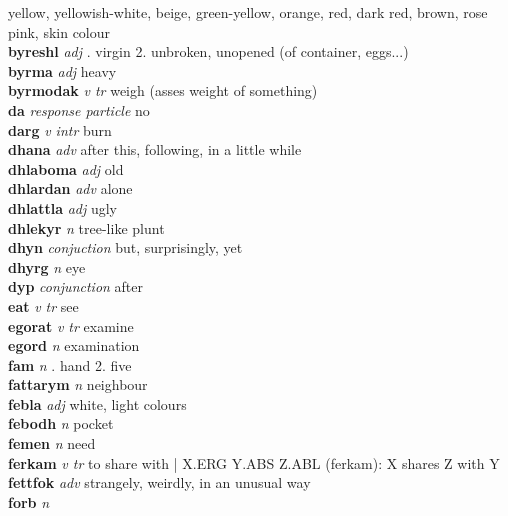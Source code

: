 yellow, yellowish-white, beige, green-yellow, orange, red, dark red, brown, rose pink, skin colour \\\textbf{byreshl}   \emph{adj} . virgin 2. unbroken, unopened (of container, eggs...) \\\textbf{byrma}   \emph{adj} \textperiodcentered heavy\\\textbf{byrmodak}   \emph{v tr} \textperiodcentered weigh (asses weight of something)\\\textbf{da}   \emph{response particle} \textperiodcentered no\\\textbf{darg}   \emph{v intr} \textperiodcentered burn\\\textbf{dhana}   \emph{adv} \textperiodcentered after this, following, in a little while\\\textbf{dhlaboma}   \emph{adj} \textperiodcentered old\\\textbf{dhlardan}   \emph{adv} \textperiodcentered alone\\\textbf{dhlattla}   \emph{adj} \textperiodcentered ugly\\\textbf{dhlekyr}   \emph{n} \textperiodcentered tree-like plunt\\\textbf{dhyn}   \emph{conjuction} \textperiodcentered but, surprisingly, yet\\\textbf{dhyrg}   \emph{n} \textperiodcentered eye\\\textbf{dyp}   \emph{conjunction} \textperiodcentered after\\\textbf{eat}   \emph{v tr} \textperiodcentered see\\\textbf{egorat}   \emph{v tr} \textperiodcentered examine\\\textbf{egord}   \emph{n} \textperiodcentered examination\\\textbf{fam}   \emph{n} . hand 2. five \\\textbf{fattarym}   \emph{n} \textperiodcentered neighbour\\\textbf{febla}   \emph{adj} \textperiodcentered white, light colours\\\textbf{febodh}   \emph{n} \textperiodcentered pocket\\\textbf{femen}   \emph{n} \textperiodcentered need\\\textbf{ferkam}   \emph{v tr} \textperiodcentered to share with | X.ERG Y.ABS Z.ABL (ferkam): X shares Z with Y\\\textbf{fettfok}   \emph{adv} \textperiodcentered strangely, weirdly, in an unusual way\\\textbf{forb}   \emph{n} 